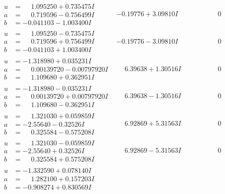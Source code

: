 \documentclass[1p]{elsarticle_modified}
\theoremstyle{definition}
\begin{document}
$$\begin{array}{c|c|c}
\begin{aligned}
u &= \phantom{-}1.095250 + 0.735475 I \\
a &= \phantom{-}0.719596 - 0.756499 I \\
b &= -0.041103 - 1.003400 I\end{aligned}
 & -0.19776 + 3.09810 I & \phantom{-0.000000 } 0 \\ \hline\begin{aligned}
u &= \phantom{-}1.095250 - 0.735475 I \\
a &= \phantom{-}0.719596 + 0.756499 I \\
b &= -0.041103 + 1.003400 I\end{aligned}
 & -0.19776 - 3.09810 I & \phantom{-0.000000 } 0 \\ \hline\begin{aligned}
u &= -1.318980 + 0.035231 I \\
a &= \phantom{-}0.00139720 - 0.00797920 I \\
b &= \phantom{-}1.109680 + 0.362951 I\end{aligned}
 & \phantom{-}6.39638 + 1.30516 I & \phantom{-0.000000 } 0 \\ \hline\begin{aligned}
u &= -1.318980 - 0.035231 I \\
a &= \phantom{-}0.00139720 + 0.00797920 I \\
b &= \phantom{-}1.109680 - 0.362951 I\end{aligned}
 & \phantom{-}6.39638 - 1.30516 I & \phantom{-0.000000 } 0 \\ \hline\begin{aligned}
u &= \phantom{-}1.321030 + 0.059859 I \\
a &= -2.55640 - 0.32526 I \\
b &= \phantom{-}0.325584 - 0.575208 I\end{aligned}
 & \phantom{-}6.92869 + 5.31563 I & \phantom{-0.000000 } 0 \\ \hline\begin{aligned}
u &= \phantom{-}1.321030 - 0.059859 I \\
a &= -2.55640 + 0.32526 I \\
b &= \phantom{-}0.325584 + 0.575208 I\end{aligned}
 & \phantom{-}6.92869 - 5.31563 I & \phantom{-0.000000 } 0 \\ \hline\begin{aligned}
u &= -1.332590 + 0.078140 I \\
a &= \phantom{-}1.282100 + 0.157203 I \\
b &= -0.908274 + 0.830569 I\end{aligned}

\end{array}$$
\end{document}
